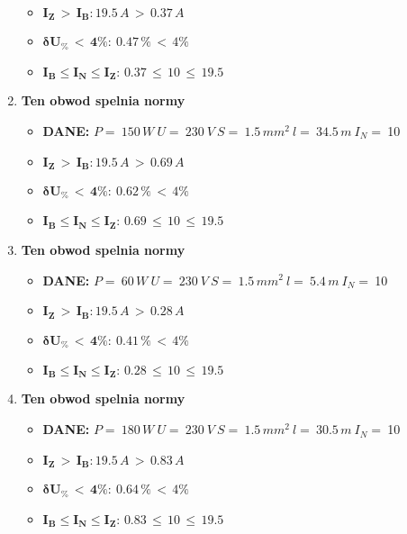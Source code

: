 \begin{enumerate}
\begin{itemize}
\item[\textcolor{Green}{\cmark}] $ \pmb{I_Z \, >  \, I_B: }19.5 \, A \, > \,0.37 \, A $
\item[\textcolor{Green}{\cmark}] $ \pmb{ \delta U_\% \, < \, 4\%:} \:0.47 \, \% \,< \, 4\% $
\item[\textcolor{Green}{\cmark}] $ \pmb{I_B \le I_N \le I_Z: } \, 0.37 \, \le \,10 \, \le \,19.5 $
\end{itemize}
\item \textcolor{Green}{\cmark} \textbf{Ten obwod spelnia normy} 
\begin{itemize}
\item[] \textbf{DANE: } \: $ P = \:150\, W\: U = \:230\: V\: S = \:1.5\, mm^2\: l = \:34.5\, m\: I_N= \: $10
\item[\textcolor{Green}{\cmark}] $ \pmb{I_Z \, >  \, I_B: }19.5 \, A \, > \,0.69 \, A $
\item[\textcolor{Green}{\cmark}] $ \pmb{ \delta U_\% \, < \, 4\%:} \:0.62 \, \% \,< \, 4\% $
\item[\textcolor{Green}{\cmark}] $ \pmb{I_B \le I_N \le I_Z: } \, 0.69 \, \le \,10 \, \le \,19.5 $
\end{itemize}
\item \textcolor{Green}{\cmark} \textbf{Ten obwod spelnia normy} 
\begin{itemize}
\item[] \textbf{DANE: } \: $ P = \:60\, W\: U = \:230\: V\: S = \:1.5\, mm^2\: l = \:5.4\, m\: I_N= \: $10
\item[\textcolor{Green}{\cmark}] $ \pmb{I_Z \, >  \, I_B: }19.5 \, A \, > \,0.28 \, A $
\item[\textcolor{Green}{\cmark}] $ \pmb{ \delta U_\% \, < \, 4\%:} \:0.41 \, \% \,< \, 4\% $
\item[\textcolor{Green}{\cmark}] $ \pmb{I_B \le I_N \le I_Z: } \, 0.28 \, \le \,10 \, \le \,19.5 $
\end{itemize}
\item \textcolor{Green}{\cmark} \textbf{Ten obwod spelnia normy} 
\begin{itemize}
\item[] \textbf{DANE: } \: $ P = \:180\, W\: U = \:230\: V\: S = \:1.5\, mm^2\: l = \:30.5\, m\: I_N= \: $10
\item[\textcolor{Green}{\cmark}] $ \pmb{I_Z \, >  \, I_B: }19.5 \, A \, > \,0.83 \, A $
\item[\textcolor{Green}{\cmark}] $ \pmb{ \delta U_\% \, < \, 4\%:} \:0.64 \, \% \,< \, 4\% $
\item[\textcolor{Green}{\cmark}] $ \pmb{I_B \le I_N \le I_Z: } \, 0.83 \, \le \,10 \, \le \,19.5 $

\end{itemize}
\end{enumerate}
